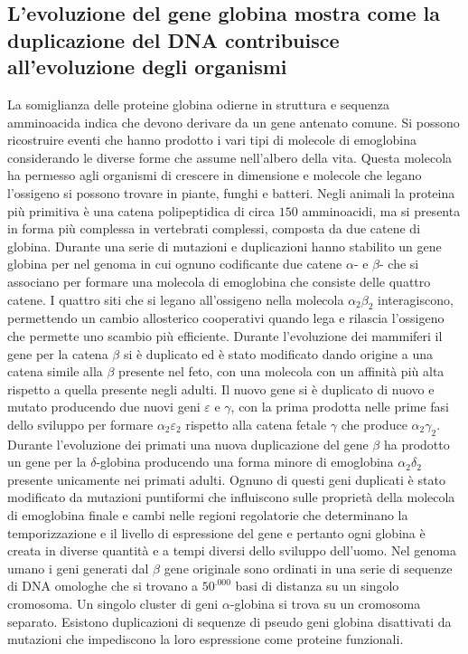 \subsection{L'evoluzione del gene globina mostra come la duplicazione del DNA contribuisce all'evoluzione degli organismi}
La somiglianza delle proteine globina odierne in struttura e sequenza amminoacida indica che devono derivare da un gene antenato comune. Si possono ricostruire eventi che hanno prodotto
i vari tipi di molecole di emoglobina considerando le diverse forme che assume nell'albero della vita. Questa molecola ha permesso agli organismi di crescere in dimensione e molecole 
che legano l'ossigeno si possono trovare in piante, funghi e batteri. Negli animali la proteina pi\`u primitiva \`e una catena polipeptidica di circa $150$ amminoacidi, ma si presenta in
forma pi\`u complessa in vertebrati complessi, composta da due catene di globina. Durante una serie di mutazioni e duplicazioni hanno stabilito un gene globina per nel genoma in cui 
ognuno codificante due catene $\alpha$- e $\beta$- che si associano per formare una molecola di emoglobina che consiste delle quattro catene. I quattro siti che si legano all'ossigeno
nella molecola $\alpha_2\beta_2$ interagiscono, permettendo un cambio allosterico cooperativi quando lega e rilascia l'ossigeno che permette uno scambio pi\`u efficiente. Durante 
l'evoluzione dei mammiferi il gene per la catena $\beta$ si \`e duplicato ed \`e stato modificato dando origine a una catena simile alla $\beta$ presente nel feto, con una molecola con 
un affinit\`a pi\`u alta rispetto a quella presente negli adulti. Il nuovo gene si \`e duplicato di nuovo e mutato producendo due nuovi geni $\varepsilon$ e $\gamma$, con la prima 
prodotta nelle prime fasi dello sviluppo per formare $\alpha_2\varepsilon_2$ rispetto alla catena fetale $\gamma$ che produce $\alpha_2\gamma_2$. Durante l'evoluzione dei primati una 
nuova duplicazione del gene $\beta$ ha prodotto un gene per la $\delta$-globina producendo una forma minore di emoglobina $\alpha_2\delta_2$ presente unicamente nei primati adulti.
Ognuno di questi geni duplicati \`e stato modificato da mutazioni puntiformi che influiscono sulle propriet\`a della molecola di emoglobina finale e cambi nelle regioni regolatorie che
determinano la temporizzazione e il livello di espressione del gene e pertanto ogni globina \`e creata in diverse quantit\`a e a tempi diversi dello sviluppo dell'uomo. Nel genoma umano 
i geni generati dal $\beta$ gene originale sono ordinati in una serie di sequenze di DNA omologhe che si trovano a $50^.000$ basi di distanza su un singolo cromosoma. Un singolo cluster
di geni $\alpha$-globina si trova su un cromosoma separato. Esistono duplicazioni di sequenze di pseudo geni globina disattivati da mutazioni che impediscono la loro espressione come
proteine funzionali.
